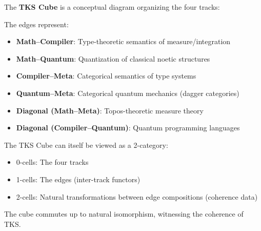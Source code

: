 \begin{definition}
\label{def:tks-cube}
The \textbf{TKS Cube} is a conceptual diagram organizing the four tracks:

\begin{center}
\end{center}

The edges represent:
\begin{itemize}
  \item \textbf{Math--Compiler}: Type-theoretic semantics of measure/integration
  \item \textbf{Math--Quantum}: Quantization of classical noetic structures
  \item \textbf{Compiler--Meta}: Categorical semantics of type systems
  \item \textbf{Quantum--Meta}: Categorical quantum mechanics (dagger categories)
  \item \textbf{Diagonal (Math--Meta)}: Topos-theoretic measure theory
  \item \textbf{Diagonal (Compiler--Quantum)}: Quantum programming languages
\end{itemize}
\end{definition}

\begin{remark}
\label{rem:cube-2-cat}
The TKS Cube can itself be viewed as a 2-category:
\begin{itemize}
  \item 0-cells: The four tracks
  \item 1-cells: The edges (inter-track functors)
  \item 2-cells: Natural transformations between edge compositions
        (coherence data)
\end{itemize}
The cube commutes up to natural isomorphism, witnessing the coherence of TKS.
\end{remark}

